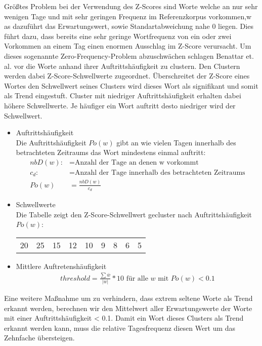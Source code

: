 Größtes Problem bei der Verwendung des Z-Scores sind Worte welche an nur sehr wenigen Tage und mit sehr geringen Frequenz im Referenzkorpus vorkommen,w as dazuführt das Erwartungswert, sowie Standartabweichung nahe 0 liegen. Dies führt dazu, dass bereits eine sehr geringe Wortfrequenz von ein oder zwei Vorkommen an einem Tag einen enormen Ausschlag im Z-Score verursacht. Um dieses sogenannte Zero-Frequency-Problem abzuschwächen schlagen Benattar et. al. vor die Worte anhand ihrer Auftrittshäufigkeit zu clustern. Den Clustern werden dabei Z-Score-Schwellwerte zugeordnet. Überschreitet der Z-Score eines Wortes den Schwellwert seines Clusters wird dieses Wort als signifikant und somit als Trend eingestuft. Cluster mit niedriger Auftrittshäufigkeit erhalten dabei höhere Schwellwerte. Je häufiger ein Wort auftritt desto niedriger wird der Schwellwert. 

\begin{itemize}
	
	\item{Auftrittshäufigkeit}\\
		Die Auftrittshäufigkeit $Po(w)$ gibt an wie vielen Tagen innerhalb des betrachteten Zeitraums das Wort mindestens einmal auftritt:
		\begin{align*}
		 	nbD(w) :&= \text{Anzahl der Tage an denen w vorkommt} \\
			c_d	   :&= \text{Anzahl der Tage innerhalb des betrachteten Zeitraums}\\
			  Po(w) &=\frac{nbD(w)}{c_d}
		\end{align*}

	\item{Schwellwerte}\\
		Die Tabelle zeigt den Z-Score-Schwellwert gecluster nach Auftrittshäufigkeit $Po(w)$:\\
		\begin{tabular}{|c|c|c|c|c|c|c|c|c|}
			\hline
			[0-5[ & [5-10[ & [10-20[ & [20-30[ & [30-50[ & [50-60[ & [60-70[ & [70-80[ & [80-100] \\
			\hline
			20 & 25 & 15 & 12 & 10 & 9 & 8 & 6 & 5 \\
			\hline
		\end{tabular}
		
	\item{Mittlere Auftretenshäufigkeit}\\
		\begin{align*}
			threshold = \frac{\sum{\bar{w}}}{|w|} * 10 \text{ für alle $w$ mit } Po(w) < 0.1
		\end{align*}	
\end{itemize}
		
Eine weitere Maßnahme um zu verhindern, dass extrem seltene Worte als Trend erkannt werden, berechnen wir den Mittelwert aller Erwartungswerte der Worte mit einer Auftrittshäufigkeit < 0.1. Damit ein Wort dieses Clusters als Trend erkannt werden kann, muss die relative Tagesfrequenz diesen Wert um das Zehnfache übersteigen.


 		
			
